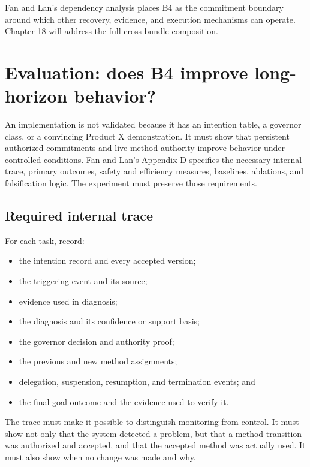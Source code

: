 Fan and Lan's dependency analysis places B4 as the commitment boundary around which other recovery, evidence, and execution mechanisms can operate. Chapter 18 will address the full cross-bundle composition.

\section{Evaluation: does B4 improve long-horizon behavior?}
\label{sec:ch15-evaluation}

An implementation is not validated because it has an intention table, a governor class, or a convincing Product X demonstration. It must show that persistent authorized commitments and live method authority improve behavior under controlled conditions. Fan and Lan's Appendix D specifies the necessary internal trace, primary outcomes, safety and efficiency measures, baselines, ablations, and falsification logic. The experiment must preserve those requirements.

\subsection{Required internal trace}

For each task, record:

\begin{itemize}
  \item the intention record and every accepted version;
  \item the triggering event and its source;
  \item evidence used in diagnosis;
  \item the diagnosis and its confidence or support basis;
  \item the governor decision and authority proof;
  \item the previous and new method assignments;
  \item delegation, suspension, resumption, and termination events; and
  \item the final goal outcome and the evidence used to verify it.
\end{itemize}

The trace must make it possible to distinguish monitoring from control. It must show not only that the system detected a problem, but that a method transition was authorized and accepted, and that the accepted method was actually used. It must also show when no change was made and why.

